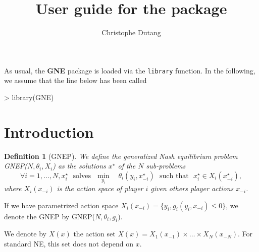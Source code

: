 \documentclass[11pt, a4paper]{article}
\title{User guide for the \pkg{GNE} package}
\author{Christophe Dutang}
\newcommand{\pkg}{\textbf}
\newcommand{\code}{\texttt}
\newcommand{\txtm}[1]{\textrm{~~#1~~}}
\newtheorem{mydef}{Definition}
\begin{document}


\maketitle


As usual, the \pkg{GNE} package is loaded via the \code{library} function. In the following, we assume that the line below has been called
\begin{Schunk}
\begin{Sinput}
> library(GNE)
\end{Sinput}
\end{Schunk}

\section{Introduction}

\begin{mydef}[GNEP]
We define the generalized Nash equilibrium problem GNEP($N, \theta_i, X_i$) as the solutions $x^\star$ of the $N$ sub-problems
$$
\forall i = 1, \dots, N, x_i^\star \txtm{solves} 
\underset{ y_i }{\min} 
\quad
\theta_i(y_i, x_{-i}^\star)
\txtm{such that} x_i^\star \in X_i(x_{-i}^\star),
$$
where $X_i(x_{-i})$ is the action space of player $i$ given others player actions $x_{-i}$.
\end{mydef}

If we have parametrized action space $X_i(x_{-i}) = \{ y_i, g_i(y_i, x_{-i}) \leq 0  \}$, we denote the GNEP by  GNEP($N, \theta_i, g_i$).

We denote by $X(x) $ the action set $X(x) = X_1(x_{-1}) \times \dots \times X_N(x_{-N})$. For standard NE, this set does not depend on $x$.
\end{document}
